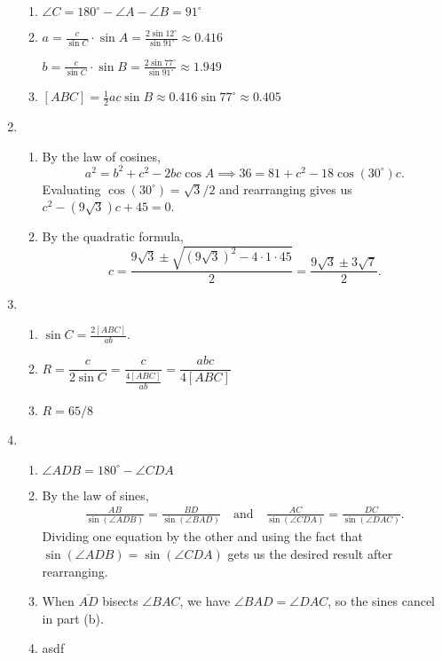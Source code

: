 \begin{enumerate}
\begin{enumerate}
\item $\angle C = 180^{\circ} - \angle A - \angle B = 91^{\circ}$
\item $a = \frac{c}{\sin C}\cdot\sin A = \frac{2\sin 12^{\circ}}{\sin 91^{\circ}}\approx 0.416$\par
$b = \frac{c}{\sin C}\cdot\sin B = \frac{2\sin 77^{\circ}}{\sin 91^{\circ}}\approx 1.949$
\item $[ABC] = \frac{1}{2}ac\sin B\approx 0.416\sin 77^{\circ}\approx 0.405$
\end{enumerate}
\item \begin{enumerate}
\item By the law of cosines,
\begin{equation*}
a^2 = b^2 + c^2 - 2bc\cos A\implies 36 = 81 + c^2 - 18\cos(30^{\circ})c.
\end{equation*}
Evaluating $\cos(30^{\circ}) = \sqrt{3}/2$ and rearranging gives us $c^2 - (9\sqrt{3})c + 45 = 0$.
\item By the quadratic formula,
\begin{equation*}
c = \frac{9\sqrt{3}\pm\sqrt{(9\sqrt{3})^2 - 4\cdot 1\cdot 45}}{2} = \frac{9\sqrt{3}\pm 3\sqrt{7}}{2}.
\end{equation*}
\end{enumerate}
\item \begin{enumerate}
\item $\sin C = \frac{2[ABC]}{ab}$.
\item $R = \dfrac{c}{2\sin C} = \dfrac{c}{\frac{4[ABC]}{ab}} = \dfrac{abc}{4[ABC]}$
\item $R = 65/8$
\end{enumerate}
\item \begin{enumerate}
\item $\angle ADB = 180^{\circ} - \angle CDA$
\item By the law of sines,
\begin{align*}
\frac{AB}{\sin(\angle ADB)} = \frac{BD}{\sin(\angle BAD)}\quad\text{and}\quad\frac{AC}{\sin(\angle CDA)} = \frac{DC}{\sin(\angle DAC)}.
\end{align*}
Dividing one equation by the other and using the fact that $\sin(\angle ADB) = \sin(\angle CDA)$ gets us the desired result after rearranging.
\item When $\overline{AD}$ bisects $\angle BAC$, we have $\angle BAD = \angle DAC$, so the sines cancel in part (b).
\item asdf

\end{enumerate}
\end{enumerate}
